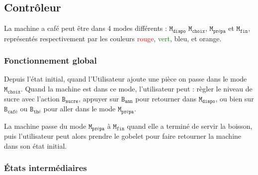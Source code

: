 \documentclass{article}
\begin{document}
\subsection{Contrôleur}

La machine a café peut être dans 4 modes différents : $\texttt{M}_\texttt{dispo}$ $\texttt{M}_\texttt{choix}$, $\texttt{M}_\texttt{prépa}$ et $\texttt{M}_\texttt{fin}$, représentés respectivement par les couleurs \textcolor{red}{rouge}, \textcolor{green}{vert}, \textcolor{blue!50}{bleu}, et \textcolor{orange!80}{orange}.

\subsubsection{Fonctionnement global}

Depuis l'état initial, quand l'Utilisateur ajoute une pièce on passe dans le mode $\texttt{M}_\texttt{choix}$. Quand la machine est dans ce mode, l'utilisateur peut : règler le niveau de sucre avec l'action $\texttt{B}_\texttt{sucre}$, appuyer sur $\texttt{B}_\texttt{ann}$ pour retourner dans $\texttt{M}_\texttt{dispo}$, ou bien sur $\texttt{B}_\texttt{café}$ ou $\texttt{B}_\texttt{thé}$ pour aller dans le mode $\texttt{M}_\texttt{prépa}$. 

La machine passe du mode $\texttt{M}_\texttt{prépa}$ à $\texttt{M}_\texttt{fin}$ quand elle a terminé de servir la boisson, puis l'utilisateur peut alors prendre le gobelet pour faire retourner la machine dans son état initial.

\begin{figure}[h]
	\centering
{}
\end{figure}

\subsubsection{États intermédiaires}
\end{document}
